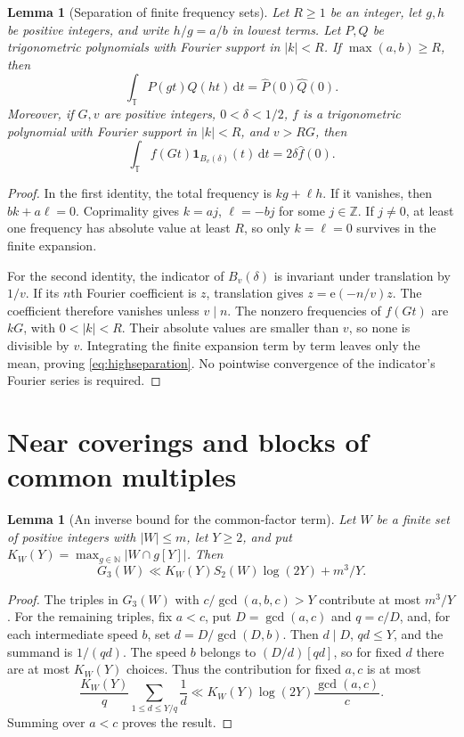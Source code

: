 \documentclass[12pt,leqno]{article}
\numberwithin{equation}{section}
\newtheorem{lemma}[theorem]{Lemma}
\theoremstyle{remark}
\newcommand{\LRtorus}{\mathbb T}
\newcommand{\LRnatural}{\mathbb N}
\newcommand{\LRinteger}{\mathbb Z}
\newcommand{\LRindicator}{\mathbf 1}
\newcommand{\LRdifferential}{\,\mathrm d}
\begin{document}
\begin{lemma}[Separation of finite frequency sets]\label{lem:separation}
Let $R\ge1$ be an integer, let $g,h$ be positive integers, and write $h/g=a/b$ in lowest terms. Let $P,Q$ be trigonometric polynomials with Fourier support in $|k|<R$. If $\max(a,b)\ge R$, then
\begin{equation}\label{eq:separation}
\int_{\LRtorus}P(gt)Q(ht)\LRdifferential t
=\widehat P(0)\widehat Q(0).
\end{equation}
Moreover, if $G,v$ are positive integers, $0<\delta<1/2$, $f$ is a trigonometric polynomial with Fourier support in $|k|<R$, and $v>RG$, then
\begin{equation}\label{eq:highseparation}
\int_{\LRtorus}f(Gt)\LRindicator_{B_v(\delta)}(t)\LRdifferential t
=2\delta\widehat f(0).
\end{equation}
\end{lemma}
\begin{proof}
In the first identity, the total frequency is $kg+\ell h$. If it vanishes, then $bk+a\ell=0$. Coprimality gives $k=aj$, $\ell=-bj$ for some $j\in\LRinteger$. If $j\ne0$, at least one frequency has absolute value at least $R$, so only $k=\ell=0$ survives in the finite expansion.

For the second identity, the indicator of $B_v(\delta)$ is invariant under translation by $1/v$. If its $n$th Fourier coefficient is $z$, translation gives $z=\mathrm e(-n/v)z$. The coefficient therefore vanishes unless $v\mid n$. The nonzero frequencies of $f(Gt)$ are $kG$, with $0<|k|<R$. Their absolute values are smaller than $v$, so none is divisible by $v$. Integrating the finite expansion term by term leaves only the mean, proving \eqref{eq:highseparation}. No pointwise convergence of the indicator's Fourier series is required.
\end{proof}

\section{Near coverings and blocks of common multiples}
\begin{lemma}[An inverse bound for the common-factor term]\label{lem:inverse}
Let $W$ be a finite set of positive integers with $|W|\le m$, let $Y\ge2$, and put $K_W(Y)=\max_{g\in\LRnatural}|W\cap g[Y]|$. Then
\begin{equation}\label{eq:inverse}
G_3(W)\ll K_W(Y)S_2(W)\log(2Y)+m^3/Y.
\end{equation}
\end{lemma}
\begin{proof}
The triples in $G_3(W)$ with $c/\gcd(a,b,c)>Y$ contribute at most $m^3/Y$. For the remaining triples, fix $a<c$, put $D=\gcd(a,c)$ and $q=c/D$, and, for each intermediate speed $b$, set $d=D/\gcd(D,b)$. Then $d\mid D$, $qd\le Y$, and the summand is $1/(qd)$. The speed $b$ belongs to $(D/d)[qd]$, so for fixed $d$ there are at most $K_W(Y)$ choices. Thus the contribution for fixed $a,c$ is at most
\[
\frac{K_W(Y)}q\sum_{1\le d\le Y/q}\frac1d
\ll K_W(Y)\log(2Y)\frac{\gcd(a,c)}c.
\]
Summing over $a<c$ proves the result.
\end{proof}
\end{document}

